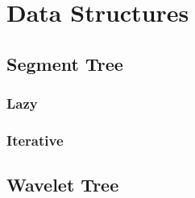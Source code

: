 \documentclass[../Notes/main.tex]{subfiles}
\begin{document}
\section{Data Structures}

\subsection{Segment Tree}

\subsubsection{Lazy}


\subsubsection{Iterative}


\subsection{Wavelet Tree}

\end{document}
